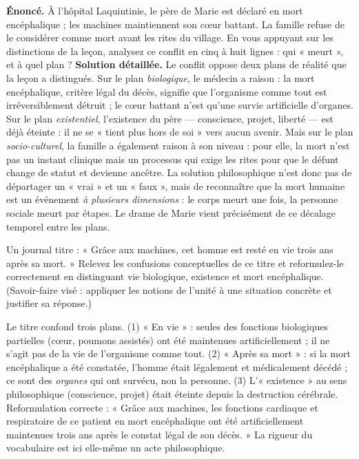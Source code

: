 \documentclass[11pt]{article}
\begin{document}
\begin{exoresolu}
\textbf{Énoncé.} À l'hôpital Laquintinie, le père de Marie est déclaré en mort encéphalique ; les machines maintiennent son cœur battant. La famille refuse de le considérer comme mort avant les rites du village. En vous appuyant sur les distinctions de la leçon, analysez ce conflit en cinq à huit lignes : qui « meurt », et à quel plan ?
\tcblower
\textbf{Solution détaillée.} Le conflit oppose deux plans de réalité que la leçon a distingués. Sur le plan \emph{biologique}, le médecin a raison : la mort encéphalique, critère légal du décès, signifie que l'organisme comme tout est irréversiblement détruit ; le cœur battant n'est qu'une survie artificielle d'organes. Sur le plan \emph{existentiel}, l'existence du père — conscience, projet, liberté — est déjà éteinte : il ne se « tient plus hors de soi » vers aucun avenir. Mais sur le plan \emph{socio-culturel}, la famille a également raison à son niveau : pour elle, la mort n'est pas un instant clinique mais un processus qui exige les rites pour que le défunt change de statut et devienne ancêtre. La solution philosophique n'est donc pas de départager un « vrai » et un « faux », mais de reconnaître que la mort humaine est un événement \emph{à plusieurs dimensions} : le corps meurt une fois, la personne sociale meurt par étapes. Le drame de Marie vient précisément de ce décalage temporel entre les plans.
\end{exoresolu}

\begin{exercice}
Un journal titre : « Grâce aux machines, cet homme est resté en vie trois ans après sa mort. » Relevez les confusions conceptuelles de ce titre et reformulez-le correctement en distinguant vie biologique, existence et mort encéphalique. (Savoir-faire visé : appliquer les notions de l'unité à une situation concrète et justifier sa réponse.)
\end{exercice}

\begin{corrige}[Exercice 1]
Le titre confond trois plans. (1) « En vie » : seules des fonctions biologiques partielles (cœur, poumons assistés) ont été maintenues artificiellement ; il ne s'agit pas de la vie de l'organisme comme tout. (2) « Après sa mort » : si la mort encéphalique a été constatée, l'homme était légalement et médicalement décédé ; ce sont des \emph{organes} qui ont survécu, non la personne. (3) L'« existence » au sens philosophique (conscience, projet) était éteinte depuis la destruction cérébrale. Reformulation correcte : « Grâce aux machines, les fonctions cardiaque et respiratoire de ce patient en mort encéphalique ont été artificiellement maintenues trois ans après le constat légal de son décès. » La rigueur du vocabulaire est ici elle-même un acte philosophique.
\end{corrige}
\end{document}
